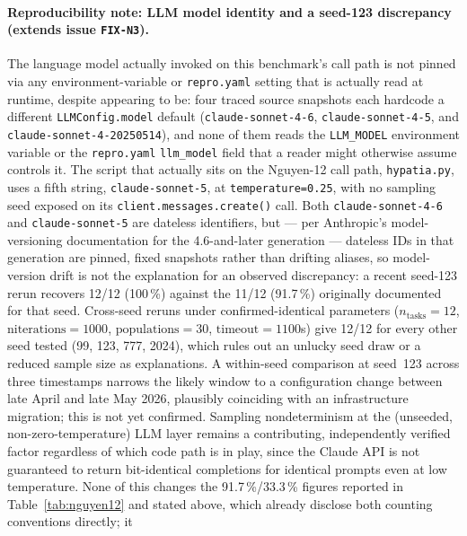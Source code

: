 
\paragraph{Reproducibility note: LLM model identity and a seed-123
discrepancy (extends issue \texttt{FIX-N3}).} The language model actually
invoked on this benchmark's call path is not pinned via any
environment-variable or \texttt{repro.yaml} setting that is actually read
at runtime, despite appearing to be: four traced source snapshots each
hardcode a different \texttt{LLMConfig.model} default
(\texttt{claude-sonnet-4-6}, \texttt{claude-sonnet-4-5}, and
\texttt{claude-sonnet-4-20250514}), and none of them reads the
\texttt{LLM\_MODEL} environment variable or the \texttt{repro.yaml}
\texttt{llm\_model} field that a reader might otherwise assume controls
it. The script that actually sits on the Nguyen-12 call path,
\texttt{hypatia.py}, uses a fifth string, \texttt{claude-sonnet-5}, at
\texttt{temperature=0.25}, with no sampling seed exposed on its
\texttt{client.messages.create()} call. Both \texttt{claude-sonnet-4-6}
and \texttt{claude-sonnet-5} are dateless identifiers, but --- per
Anthropic's model-versioning documentation for the 4.6-and-later
generation --- dateless IDs in that generation are pinned, fixed
snapshots rather than drifting aliases, so model-version drift is not the
explanation for an observed discrepancy: a recent seed-123 rerun recovers
12/12 (100\,\%) against the 11/12 (91.7\,\%) originally documented for
that seed. Cross-seed reruns under confirmed-identical parameters
($n_{\text{tasks}}=12$, $\text{niterations}=1000$, $\text{populations}=30$,
$\text{timeout}=1100$s) give 12/12 for every other seed tested (99, 123,
777, 2024), which rules out an unlucky seed draw or a reduced sample size
as explanations. A within-seed comparison at seed~123 across three
timestamps narrows the likely window to a configuration change between
late April and late May 2026, plausibly coinciding with an infrastructure
migration; this is not yet confirmed. Sampling nondeterminism at the
(unseeded, non-zero-temperature) LLM layer remains a contributing,
independently verified factor regardless of which code path is in play,
since the Claude API is not guaranteed to return bit-identical completions
for identical prompts even at low temperature. None of this changes the
91.7\,\%/33.3\,\% figures reported in Table~\ref{tab:nguyen12} and stated
above, which already disclose both counting conventions directly; it

